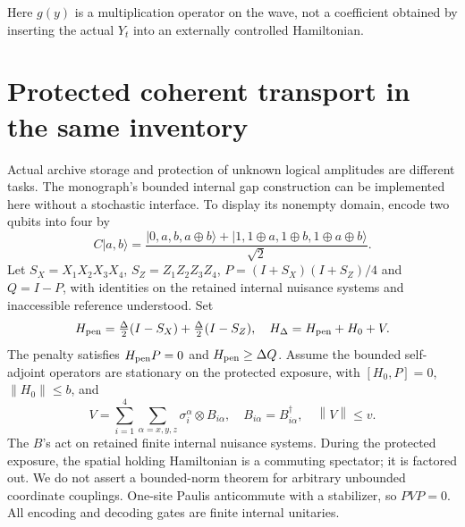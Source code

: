 \documentclass[11pt]{article}
\theoremstyle{definition}\newtheorem{assumption}[theorem]{Constitutive assumption}
\theoremstyle{remark}\newtheorem{remark}[theorem]{Remark}
\newcommand{\ket}[1]{|#1\rangle}\newcommand{\bra}[1]{\langle#1|}
\newcommand{\norm}[1]{\left\|#1\right\|}\newcommand{\pos}[1]{[#1]_+}
\begin{document}
Here $g(y)$ is a multiplication operator on the wave, not a coefficient obtained by inserting the actual $Y_t$ into an externally controlled Hamiltonian.

\section{Protected coherent transport in the same inventory}
\label{sec:protection}
Actual archive storage and protection of unknown logical amplitudes are different tasks. The monograph's bounded internal gap construction can be implemented here without a stochastic interface. To display its nonempty domain, encode two qubits into four by
\[
 C\ket{a,b}=\frac{\ket{0,a,b,a\oplus b}+\ket{1,1\oplus a,1\oplus b,1\oplus a\oplus b}}{\sqrt2}.
\]
Let $S_X=X_1X_2X_3X_4$, $S_Z=Z_1Z_2Z_3Z_4$,
$P=(I+S_X)(I+S_Z)/4$ and $Q=I-P$, with identities on the
retained internal nuisance systems and inaccessible reference understood.
Set
\[
 H_{\rm pen}=\tfrac\Delta2(I-S_X)+\tfrac\Delta2(I-S_Z),\quad
 H_\Delta=H_{\rm pen}+H_0+V.
\]
The penalty satisfies $H_{\rm pen}P=0$ and
$H_{\rm pen}\ge\Delta Q$. Assume the bounded self-adjoint
operators are stationary on the protected exposure, with
$[H_0,P]=0$, $\norm{H_0}\le b$, and
\[
 V=\sum_{i=1}^4\sum_{\alpha=x,y,z}\sigma_i^\alpha\otimes B_{i\alpha},
 \quad B_{i\alpha}=B_{i\alpha}^\dagger,\quad\norm V\le v.
\]
The $B$'s act on retained finite internal nuisance systems. During the protected exposure, the spatial holding Hamiltonian is a commuting spectator; it is factored out. We do not assert a bounded-norm theorem for arbitrary unbounded coordinate couplings. One-site Paulis anticommute with a stabilizer, so $PVP=0$. All encoding and decoding gates are finite internal unitaries.
\end{document}
